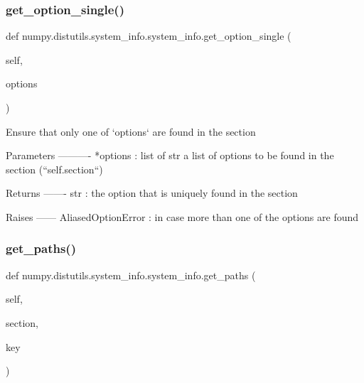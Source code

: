 \mbox{\label{classnumpy_1_1distutils_1_1system__info_1_1system__info_a928d483bf1f7ce562a858c6e942b7c32}} 
\subsubsection{\texorpdfstring{get\+\_\+option\+\_\+single()}{get\_option\_single()}}
{\footnotesize\ttfamily def numpy.\+distutils.\+system\+\_\+info.\+system\+\_\+info.\+get\+\_\+option\+\_\+single (\begin{DoxyParamCaption}\item[{}]{self,  }\item[{}]{options }\end{DoxyParamCaption})}

\begin{DoxyVerb}Ensure that only one of `options` are found in the section

Parameters
----------
*options : list of str
   a list of options to be found in the section (``self.section``)

Returns
-------
str :
    the option that is uniquely found in the section

Raises
------
AliasedOptionError :
    in case more than one of the options are found
\end{DoxyVerb}
 \mbox{\label{classnumpy_1_1distutils_1_1system__info_1_1system__info_ab69c1ea2a86f502d71fbbc380cd59393}} 
\subsubsection{\texorpdfstring{get\+\_\+paths()}{get\_paths()}}
{\footnotesize\ttfamily def numpy.\+distutils.\+system\+\_\+info.\+system\+\_\+info.\+get\+\_\+paths (\begin{DoxyParamCaption}\item[{}]{self,  }\item[{}]{section,  }\item[{}]{key }\end{DoxyParamCaption})}

